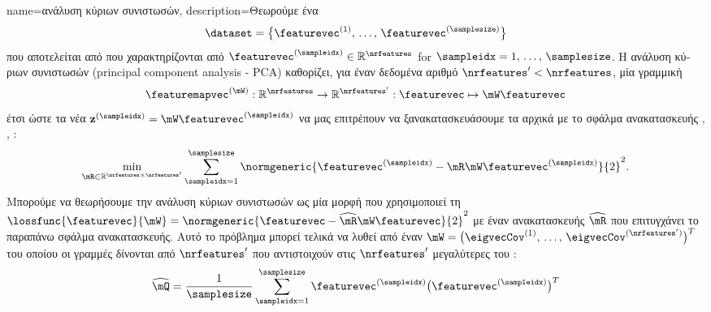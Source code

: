 {name={\foreignlanguage{greek}{ανάλυση κύριων συνιστωσών}}, 
	description={\foreignlanguage{greek}{Θεωρούμε ένα}  
		$$\dataset = \big\{ \featurevec^{(1)}, \,\ldots, \,\featurevec^{(\samplesize)} \big\}$$
		\foreignlanguage{greek}{που αποτελείται από}  \foreignlanguage{greek}{που χαρακτηρίζονται από} 
		 $\featurevec^{(\sampleidx)} \in \mathbb{R}^{\nrfeatures}$ for $\sampleidx=1,\,\ldots,\,\samplesize$.
		\foreignlanguage{greek}{Η ανάλυση κύριων συνιστωσών} 
		(principal component analysis - PCA) \foreignlanguage{greek}{καθορίζει, για έναν δεδομένα αριθμό 
		$\nrfeatures' < \nrfeatures$, μία γραμμική} 
		$$\featuremapvec^{(\mW)}: \mathbb{R}^{\nrfeatures} \rightarrow 
		\mathbb{R}^{\nrfeatures'}: \featurevec \mapsto \mW \featurevec$$
		\foreignlanguage{greek}{έτσι ώστε τα νέα}  $\mathbf{z}^{(\sampleidx)} = \mW \featurevec^{(\sampleidx)}$
		\foreignlanguage{greek}{να μας επιτρέπουν να ξανακατασκευάσουμε τα αρχικά}  
		\foreignlanguage{greek}{με το}  \foreignlanguage{greek}{σφάλμα ανακατασκευής} 
		\cite{MLBasics}, \cite{BishopBook}, \cite{hastie01statisticallearning}:
		$$\min_{\mR \in \mathbb{R}^{\nrfeatures \times \nrfeatures'}} 
		\sum_{\sampleidx=1}^{\samplesize} 
		\normgeneric{\featurevec^{(\sampleidx)}- \mR \mW \featurevec^{(\sampleidx)}}{2}^{2}.$$ 
		\foreignlanguage{greek}{Μπορούμε να θεωρήσουμε την ανάλυση κύριων συνιστωσών ως μία μορφή}  
		\foreignlanguage{greek}{που χρησιμοποιεί τη}  
		$\lossfunc{\featurevec}{\mW} = \normgeneric{\featurevec- \widehat{\mR} \mW \featurevec}{2}^{2}$ \foreignlanguage{greek}{με έναν}  
		 \foreignlanguage{greek}{ανακατασκευής $\widehat{\mR}$ που επιτυγχάνει το παραπάνω}
		 \foreignlanguage{greek}{σφάλμα ανακατασκευής. Αυτό το πρόβλημα}  
		\foreignlanguage{greek}{μπορεί τελικά να λυθεί από έναν}   
		$\mW = \big(\eigvecCov^{(1)},\,\ldots,\,\eigvecCov^{(\nrfeatures')}\big)^{T}$ \foreignlanguage{greek}{του οποίου οι γραμμές δίνονται από} 
		$\nrfeatures'$  \foreignlanguage{greek}{που αντιστοιχούν στις $\nrfeatures'$ μεγαλύτερες} 
		 \foreignlanguage{greek}{του} :
		$$\widehat{\mQ} = \frac{1}{\samplesize} \sum_{\sampleidx=1}^{\samplesize} 
		\featurevec^{(\sampleidx)} \big( \featurevec^{(\sampleidx)}\big)^{T}
$$}}

